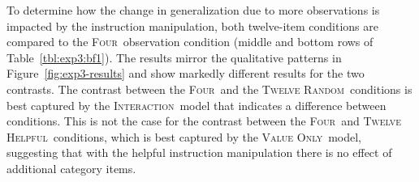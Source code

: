 \documentclass[doc,apacite]{apa6}
\newcommand{\four}{\textsc{Four}}
\newcommand{\random}{\textsc{Twelve Random}}
\newcommand{\helpful}{\textsc{Twelve Helpful}}
\newcommand{\neutral}{\textsc{Four}}
\newcommand{\valueonly}{\textsc{Value Only}}
\newcommand{\interaction}{\textsc{Interaction}}
\begin{document}
To determine how the change in generalization due to more observations is impacted by the instruction manipulation, both twelve-item conditions are compared to the \four\ observation condition (middle and bottom rows of Table~\ref{tbl:exp3:bf1}).
The results mirror the qualitative patterns in Figure~\ref{fig:exp3-results} and show markedly different results for the two contrasts.
The contrast between the \neutral\ and the \random\ conditions is best captured by the \interaction\ model that indicates a difference between conditions.
This is not the case for the contrast between the \neutral\ and \helpful\ conditions, which is best captured by the \valueonly\ model, suggesting that with the helpful instruction manipulation there is no effect of additional category items.

%

%
%
%
%
\end{document}
